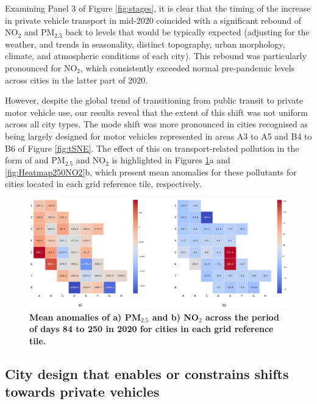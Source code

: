 \documentclass[preprint,10pt]{elsarticle} %
\begin{document}
Examining Panel 3 of Figure \ref{fig:stages}, it is clear that the timing of the increase in private vehicle transport in mid-2020 coincided with a significant rebound of NO$_{2}$ and PM$_{2.5}$ back to levels that would be typically expected (adjusting for the weather, and trends in seasonality, distinct topography, urban morphology, climate, and atmospheric conditions of each city\cite{Wijnands2022}). This rebound was particularly pronounced for NO$_{2}$, which consistently exceeded normal pre-pandemic levels across cities in the latter part of 2020.

However, despite the global trend of transitioning from public transit to private motor vehicle use\cite{fernando2023shaping}, our results reveal that the extent of this shift was not uniform across all city types. The mode shift  was more pronounced in cities recognised as being largely designed for motor vehicles\cite{Thompson2020} represented in areas A3 to A5 and B4 to B6 of Figure \ref{fig:tSNE}. The effect of this on transport-related pollution in the form of and PM$_{2.5}$ and NO$_{2}$ is highlighted in Figures \ref{fig:Heatmap250PM}a and \ref{fig:Heatmap250NO2}b, which present mean anomalies for these pollutants for cities located in each grid reference tile, respectively.

\begin{figure}
\centering
\includegraphics[trim={0 0 0 0},clip,scale=0.25]{Images/pm25Anomaly250_no2Reduction7Ave7Ave250.png}
\caption{\bf Mean anomalies of a) PM$_{2.5}$ and b) NO$_{2}$ across the period of days 84 to 250 in 2020 for cities in each grid reference tile.}  
 \label{fig:Heatmap250NO2}\label{fig:Heatmap250PM}
\end{figure}

\subsection*{City design that enables or constrains shifts towards private vehicles}
\end{document}
